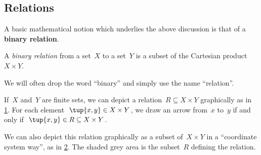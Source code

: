 \subsection{Relations}

A basic mathematical notion which underlies the above discussion is that of a \textbf{binary relation}.


\begin{definition}
A \emph{binary relation} from a set~$X$ to a set~$Y$ is a subset of the Cartesian product $X\times Y$.
\end{definition}

\begin{remark}
We will often drop the word ``binary'' and simply use the name ``relation''.
\end{remark}

If~$X$ and~$Y$ are finite sets, we can depict a relation~$R \subseteq X \times Y$ graphically as in \cref{fig:example_rel}. For each element~$\tup{x,y} \in X \times Y$, we draw an arrow from~$x$ to~$y$ if and only if~$\tup{x,y} \in R \subseteq X \times Y$.

\begin{figure}[h!]
\centering
{}
 \caption{}
\label{fig:example_rel}
\end{figure}

We can also depict this relation graphically as a subset of~$X \times Y$ in a ``coordinate system way'', as in \cref{fig:example_rel_coord}. The shaded grey area is the subset~$R$ defining the relation.

\begin{figure}[h!]
\begin{center}
\end{center}
\caption{}
\label{fig:example_rel_coord}
\end{figure}

